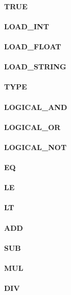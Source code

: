 \documentclass[12pt,a4paper]{article}
\begin{document}
\paragraph{TRUE}
\paragraph{LOAD\_INT}
\paragraph{LOAD\_FLOAT}
\paragraph{LOAD\_STRING}
\paragraph{TYPE}
\paragraph{LOGICAL\_AND}
\paragraph{LOGICAL\_OR}
\paragraph{LOGICAL\_NOT}
\paragraph{EQ}
\paragraph{LE}
\paragraph{LT}
\paragraph{ADD}
\paragraph{SUB}
\paragraph{MUL}
\paragraph{DIV}
\end{document}
